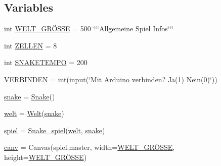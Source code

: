 \subsection*{Variables}
\begin{DoxyCompactItemize}
\item 
int \mbox{\hyperlink{namespace_snake_01_projekt_01auf_01_python_a0bb194ef42a009e15b75b9c78234ec82}{W\+E\+L\+T\+\_\+\+G\+RÖ\+S\+SE}} = 500 \char`\"{}\char`\"{}\char`\"{}Allgemeine Spiel Infos\char`\"{}\char`\"{}\char`\"{}
\item 
int \mbox{\hyperlink{namespace_snake_01_projekt_01auf_01_python_a0490a870a678eec59b0e01ade54e7cf5}{Z\+E\+L\+L\+EN}} = 8
\item 
int \mbox{\hyperlink{namespace_snake_01_projekt_01auf_01_python_abfd2595e2773b407f4e4d36545e0d6c2}{S\+N\+A\+K\+E\+T\+E\+M\+PO}} = 200
\item 
\mbox{\hyperlink{namespace_snake_01_projekt_01auf_01_python_a494a6a834239a0d8becd8a87a00ec956}{V\+E\+R\+B\+I\+N\+D\+EN}} = int(input(\char`\"{}Mit \mbox{\hyperlink{class_snake_01_projekt_01auf_01_python_1_1_arduino}{Arduino}} verbinden? Ja(1) Nein(0)\char`\"{}))
\item 
\mbox{\hyperlink{namespace_snake_01_projekt_01auf_01_python_aa798779259654cac04213978cf4297ab}{snake}} = \mbox{\hyperlink{class_snake_01_projekt_01auf_01_python_1_1_snake}{Snake}}()
\item 
\mbox{\hyperlink{namespace_snake_01_projekt_01auf_01_python_a80417409ca56d97eabc593c02dbb4a1c}{welt}} = \mbox{\hyperlink{class_snake_01_projekt_01auf_01_python_1_1_welt}{Welt}}(\mbox{\hyperlink{namespace_snake_01_projekt_01auf_01_python_aa798779259654cac04213978cf4297ab}{snake}})
\item 
\mbox{\hyperlink{namespace_snake_01_projekt_01auf_01_python_a21846080f3e252e582ecd7bf21d38f90}{spiel}} = \mbox{\hyperlink{class_snake_01_projekt_01auf_01_python_1_1_snake__spiel}{Snake\+\_\+spiel}}(\mbox{\hyperlink{namespace_snake_01_projekt_01auf_01_python_a80417409ca56d97eabc593c02dbb4a1c}{welt}}, \mbox{\hyperlink{namespace_snake_01_projekt_01auf_01_python_aa798779259654cac04213978cf4297ab}{snake}})
\item 
\mbox{\hyperlink{namespace_snake_01_projekt_01auf_01_python_a9a3afecebf45ad60fdcaa433890500d8}{canv}} = Canvas(spiel.\+master, width=\mbox{\hyperlink{namespace_snake_01_projekt_01auf_01_python_a0bb194ef42a009e15b75b9c78234ec82}{W\+E\+L\+T\+\_\+\+G\+RÖ\+S\+SE}}, height=\mbox{\hyperlink{namespace_snake_01_projekt_01auf_01_python_a0bb194ef42a009e15b75b9c78234ec82}{W\+E\+L\+T\+\_\+\+G\+RÖ\+S\+SE}})
\end{DoxyCompactItemize}


